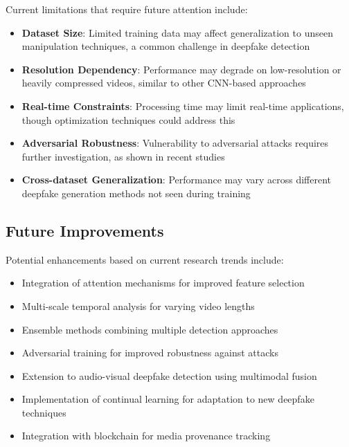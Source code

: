 \documentclass[conference]{IEEEtran}
\begin{document}
Current limitations that require future attention include:
\begin{itemize}
\item \textbf{Dataset Size}: Limited training data may affect generalization to unseen manipulation techniques, a common challenge in deepfake detection \cite{tolosana2020faceforensics}
\item \textbf{Resolution Dependency}: Performance may degrade on low-resolution or heavily compressed videos, similar to other CNN-based approaches \cite{wang2020cnn}
\item \textbf{Real-time Constraints}: Processing time may limit real-time applications, though optimization techniques could address this \cite{jiang2018face2face}
\item \textbf{Adversarial Robustness}: Vulnerability to adversarial attacks requires further investigation, as shown in recent studies \cite{carlini2020evading}
\item \textbf{Cross-dataset Generalization}: Performance may vary across different deepfake generation methods not seen during training \cite{li2020celeb}
\end{itemize}

\subsection{Future Improvements}

Potential enhancements based on current research trends include:
\begin{itemize}
\item Integration of attention mechanisms for improved feature selection \cite{vaswani2017attention}
\item Multi-scale temporal analysis for varying video lengths \cite{feichtenhofer2019slowfast}
\item Ensemble methods combining multiple detection approaches \cite{zhou2012ensemble}
\item Adversarial training for improved robustness against attacks \cite{madry2017towards}
\item Extension to audio-visual deepfake detection using multimodal fusion \cite{mittal2020emotions}
\item Implementation of continual learning for adaptation to new deepfake techniques \cite{parisi2019continual}
\item Integration with blockchain for media provenance tracking \cite{hasan2021combating}
\end{itemize}
\end{document}
